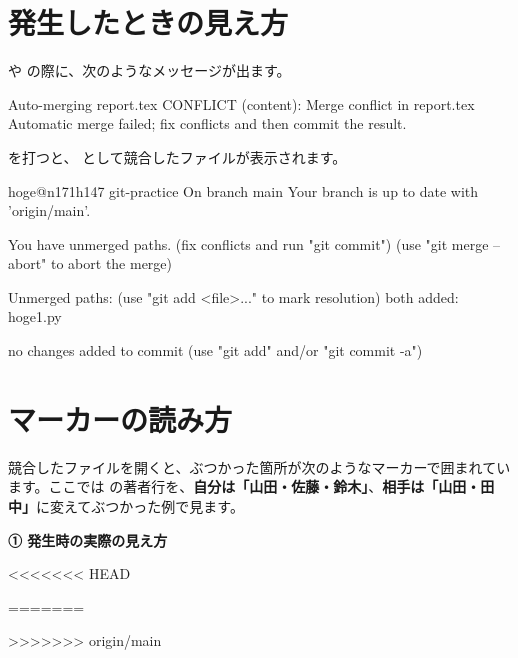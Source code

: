 \section{発生したときの見え方}

 や  の際に、次のようなメッセージが出ます。

\begin{codebox}[text]
\begin{code}
Auto-merging report.tex
CONFLICT (content): Merge conflict in report.tex
Automatic merge failed; fix conflicts and then commit the result.
\end{code}
\end{codebox}

 を打つと、 として競合したファイルが表示されます。

\begin{codebox}[text]
\begin{code}
hoge@n171h147 git-practice %
On branch main
Your branch is up to date with 'origin/main'.

You have unmerged paths.
  (fix conflicts and run "git commit")
  (use "git merge --abort" to abort the merge)

Unmerged paths:
  (use "git add <file>..." to mark resolution)
        both added:      hoge1.py

no changes added to commit (use "git add" and/or "git commit -a")
\end{code}
\end{codebox}

\section{マーカーの読み方}

競合したファイルを開くと、ぶつかった箇所が次のようなマーカーで囲まれています。ここでは  の著者行を、\textbf{自分は「山田・佐藤・鈴木」}、\textbf{相手は「山田・田中」}に変えてぶつかった例で見ます。

\noindent\textbf{① 発生時の実際の見え方}

\begin{codebox}[text]
\begin{code}
<<<<<<< HEAD
\author{山田, 佐藤, 鈴木}
=======
\author{山田, 田中}
>>>>>>> origin/main
\end{code}
\end{codebox}

